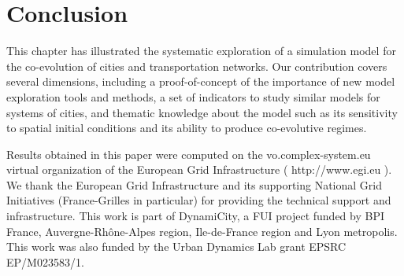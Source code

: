 \section{Conclusion}



This chapter has illustrated the systematic exploration of a simulation model for the co-evolution of cities and transportation networks. Our contribution covers several dimensions, including a proof-of-concept of the importance of new model exploration tools and methods, a set of indicators to study similar models for systems of cities, and thematic knowledge about the model such as its sensitivity to spatial initial conditions and its ability to produce co-evolutive regimes.





%
\begin{acknowledgement}
Results obtained in this paper were computed on the vo.complex-system.eu virtual organization of the European Grid Infrastructure ( http://www.egi.eu ). We thank the European Grid Infrastructure and its supporting National Grid Initiatives (France-Grilles in particular) for providing the technical support and infrastructure. This work is part of DynamiCity, a FUI project funded by BPI France, Auvergne-Rhône-Alpes region, Ile-de-France region and Lyon metropolis. This work was also funded by the Urban Dynamics Lab grant EPSRC EP/M023583/1.
\end{acknowledgement}


%
%

